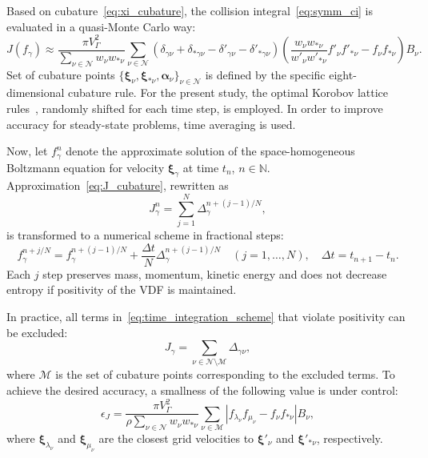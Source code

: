 \documentclass{aip-cp}
\newcommand{\bxi}{\boldsymbol{\xi}}
\newcommand{\Nu}{\mathcal{N}}
\newcommand{\Mu}{\mathcal{M}}
\begin{document}
Based on cubature~\eqref{eq:xi_cubature}, the collision integral~\eqref{eq:symm_ci} is evaluated in a quasi-Monte Carlo way:
\begin{equation}\label{eq:J_cubature}
    J(f_\gamma) \approx \frac{\pi V_\Gamma^2}{\displaystyle\sum_{\nu\in\Nu} w_{\nu}w_{*\nu}}
        \sum_{\nu\in\Nu} \left(
            \delta_{\gamma\nu} + \delta_{*\gamma\nu} - \delta'_{\gamma\nu} - \delta'_{*\gamma\nu}
        \right)\left(
            \frac{w_{\nu}w_{*\nu}}{w'_{\nu}w'_{*\nu}} f'_{\nu} f'_{*\nu} -  f_{\nu} f_{*\nu}
        \right)B_\nu.
\end{equation}
Set of cubature points \(\{\bxi_\nu, \bxi_{*\nu}, \boldsymbol{\alpha}_\nu\}_{\nu\in\Nu}\)
is defined by the specific eight-dimensional cubature rule.
For the present study, the optimal Korobov lattice rules~\cite{Dick2013},
randomly shifted for each time step, is employed.
In order to improve accuracy for steady-state problems, time averaging is used.

Now, let \(f_\gamma^n\) denote the approximate solution of the space-homogeneous Boltzmann equation
for velocity \(\bxi_\gamma\) at time \(t_n\), \(n\in\mathbb{N}\).
Approximation~\eqref{eq:J_cubature}, rewritten as
\begin{equation}\label{eq:J_cubature_short}
    J_\gamma^n = \sum_{j=1}^N \Delta_\gamma^{n+(j-1)/N},
\end{equation}
is transformed to a numerical scheme in fractional steps:
\begin{equation}\label{eq:time_integration_scheme}
     f_\gamma^{n+j/N} =  f_\gamma^{n+(j-1)/N} + \frac{\Delta{t}}{N}\Delta_{\gamma}^{n+(j-1)/N}
    \quad (j = 1,\dotsc,N), \quad \Delta{t} = t_{n+1}-t_n.
\end{equation}
Each \(j\) step preserves mass, momentum, kinetic energy and does not decrease entropy
if positivity of the VDF is maintained.

In practice, all terms in~\eqref{eq:time_integration_scheme} that violate positivity can be excluded:
\begin{equation}\label{eq:exclusion_scheme}
    J_\gamma = \sum_{\nu\in\Nu\setminus\Mu} \Delta_{\gamma\nu},
\end{equation}
where \(\Mu\) is the set of cubature points corresponding to the excluded terms.
To achieve the desired accuracy, a smallness of the following value is under control:
\begin{equation}\label{eq:epsilon_J}
    \epsilon_J = \frac{\pi V_\Gamma^2}{\rho\sum_{\nu\in\Nu} w_{\nu}w_{*\nu}}
        \sum_{\nu\in\Mu} \left|f_{\lambda_\nu}f_{\mu_\nu} - f_{\nu}f_{*\nu}\right|B_\nu,
\end{equation}
where \(\bxi_{\lambda_\nu}\) and \(\bxi_{\mu_\nu}\) are the closest grid velocities
to \(\bxi'_\nu\) and \(\bxi'_{*\nu}\), respectively.
\end{document}
